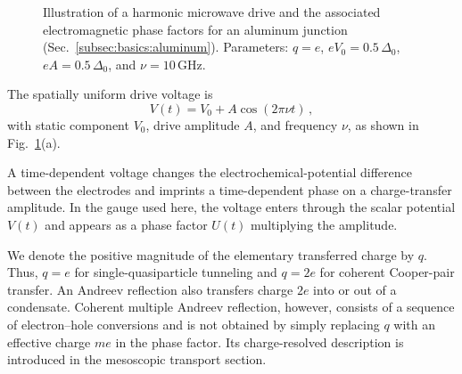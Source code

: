             \begin{figure}[t]
                \centering
                \hfill
                \hfill
                \hfill
                \caption{Illustration of a harmonic microwave drive and the associated electromagnetic phase factors for an aluminum junction (Sec.~\ref{subsec:basics:aluminum}).
                Parameters: $q=e$, $eV_0 = 0.5\,\Delta_0$, $eA = 0.5\,\Delta_0$, and $\nu=10\,\mathrm{GHz}$.}
                \label{fig:basics:microwave}
            \end{figure}

            The spatially uniform drive voltage is
            \begin{equation}
                V(t) = V_0 + A \cos (2\pi\nu t)\,,
                \label{eq:microwave}
            \end{equation}
            with static component $V_0$, drive amplitude $A$, and frequency $\nu$, as shown in Fig.~\ref{fig:basics:microwave}(a).
        
            A time-dependent voltage changes the electrochemical-potential difference between the electrodes and imprints a time-dependent phase on a charge-transfer amplitude. In the gauge used here, the voltage enters through the scalar potential $V(t)$ and appears as a phase factor $U(t)$ multiplying the amplitude.

            We denote the positive magnitude of the elementary transferred charge by $q$. Thus, $q=e$ for single-quasiparticle tunneling and $q=2e$ for coherent Cooper-pair transfer. An Andreev reflection also transfers charge $2e$ into or out of a condensate. Coherent multiple Andreev reflection, however, consists of a sequence of electron--hole conversions and is not obtained by simply replacing $q$ with an effective charge $me$ in the phase factor. Its charge-resolved description is introduced in the mesoscopic transport section.

